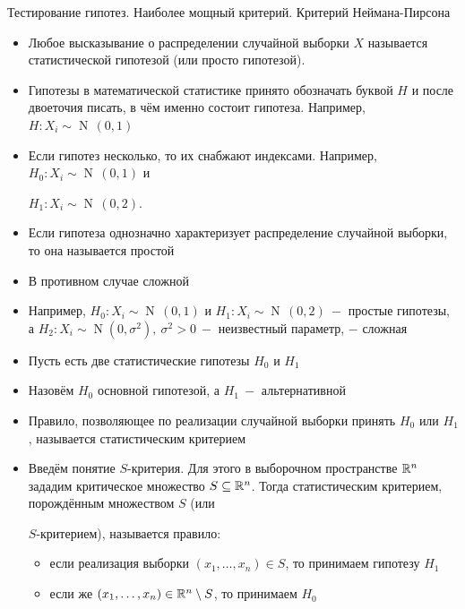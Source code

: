 \documentclass[a4paper,11pt]{article}
\begin{document}
\setcounter{mainle}{12}
\setcounter{suble}{0}
\begin{center}
    \huge Тестирование гипотез. Наиболее мощный критерий. Критерий Неймана-Пирсона
\end{center}
\begin{itemize}
    \item Любое высказывание о распределении случайной выборки $X$ называется статистической гипотезой (или просто гипотезой).
    \item Гипотезы в математической статистике принято обозначать буквой $H$ и после двоеточия писать, в чём именно состоит гипотеза. Например, $H: X_i \sim \operatorname{N}\,(0, 1)$
    \item Если гипотез несколько, то их снабжают индексами. Например, $H_0: X_i \sim \operatorname{N}\,(0,1)$ и
    
    $H_1: X_i \sim \operatorname{N}\,(0, 2)$.
    \item Если гипотеза однозначно характеризует распределение случайной выборки, то она называется простой
    \item В противном случае сложной
    \item Например, $H_0: X_i \sim \operatorname{N}\,(0, 1)$ и $H_1: X_i \sim \operatorname{N}\,(0,2)\ -$ простые гипотезы, а $H_2: X_i \sim \operatorname{N}\left(0, \sigma^2\right),\ \sigma^2 > 0\ -$ неизвестный параметр, $-$ сложная
    \item Пусть есть две статистические гипотезы $H_0$ и $H_1$
    \item Назовём $H_0$ основной гипотезой, а $H_1\ -$ альтернативной
    \item Правило, позволяющее по реализации случайной выборки принять $H_0$ или $H_1$, называется статистическим критерием
    \item Введём понятие $S$-критерия. Для этого в выборочном пространстве $\mathbb{R}^n$ зададим критическое множество $S \subseteq \mathbb{R}^n$. Тогда статистическим критерием, порождённым множеством $S$ (или
    
    $S$-критерием), называется правило:
    \begin{itemize}
        \item если реализация выборки $(x_1,\dots,x_n) \in S$, то принимаем гипотезу $H_1$
        \item если же $(x_1,\dots,x_n) \in\mathbb{R}^n \setminus S$, то принимаем $H_0$
    \end{itemize}
\end{itemize}
\end{document}
